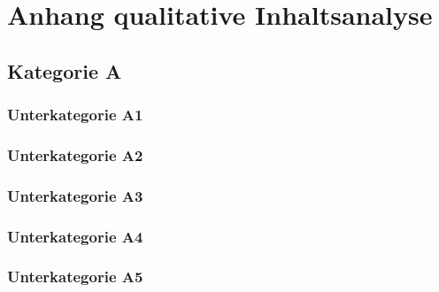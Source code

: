 

\lstset{language=C}

\chapter{Anhang qualitative Inhaltsanalyse }


\section{Kategorie A}
\subsection{Unterkategorie A1}





\subsection{Unterkategorie A2}



\subsection{Unterkategorie A3}





\subsection{Unterkategorie A4}



\subsection{Unterkategorie A5}


